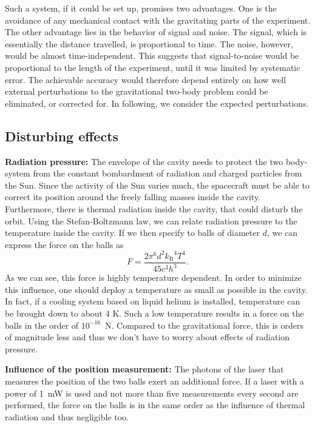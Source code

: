 \documentclass[]{rsos}
\begin{document}
Such a system, if it could be set up, promises two advantages.  One is
the avoidance of any mechanical contact with the gravitating parts of
the experiment.  The other advantage lies in the behavior of signal
and noise.  The signal, which is essentially the distance travelled,
is proportional to time. The noise, however, would be almost
time-independent. This suggests that signal-to-noise would be
proportional to the length of the experiment, until it was limited by
systematic error. The achievable accuracy would therefore depend
entirely on how well external perturbations to the gravitational
two-body problem could be eliminated, or corrected for.  In following,
we consider the expected perturbations.

\subsection{Disturbing effects}

\textbf{Radiation pressure:} The envelope of the cavity needs to protect the two body-system from the constant bombardment of radiation and charged particles from the Sun. Since the activity of the Sun varies much, the spacecraft must be able to correct its position around the freely falling masses inside the cavity.\\
Furthermore, there is thermal radiation inside the cavity, that could disturb the orbit.
Using the Stefan-Boltzmann law, we can relate radiation pressure to the temperature inside the cavity. If we then specify to balls of diameter $d$, we can express the force on the balls as 
\begin{equation}
F = \frac{2 \pi^6 d^2 {k_\mathrm{B}}^4 T^4}{45 c^3 h^3}.
\end{equation}
As we can see, this force is highly temperature dependent. In order to minimize this influence, one should deploy a temperature as small as possible in the cavity. In fact, if a cooling system based on liquid helium is installed, temperature can be brought down to about 4 K. Such a low temperature results in a force on the balls in the order of $10^{-16}$~N. Compared to the gravitational force, this is orders of magnitude less and thus we don't have to worry about effects of radiation pressure.

\textbf{Influence of the position measurement:} 
The photons of the laser that measures the position of the two balls exert an additional force. If a laser with a power of 1~mW is used and not more than five measurements every second are performed, the force on the balls is in the same order as the influence of thermal radiation and thus negligible too.
\end{document}
